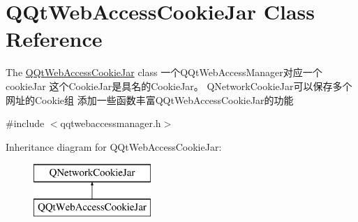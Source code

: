 \hypertarget{class_q_qt_web_access_cookie_jar}{}\section{Q\+Qt\+Web\+Access\+Cookie\+Jar Class Reference}
\label{class_q_qt_web_access_cookie_jar}


The \mbox{\hyperlink{class_q_qt_web_access_cookie_jar}{Q\+Qt\+Web\+Access\+Cookie\+Jar}} class 一个\+Q\+Qt\+Web\+Access\+Manager对应一个cookie\+Jar 这个\+Cookie\+Jar是具名的\+Cookie\+Jar。 Q\+Network\+Cookie\+Jar可以保存多个网址的\+Cookie组 添加一些函数丰富\+Q\+Qt\+Web\+Access\+Cookie\+Jar的功能  




{\ttfamily \#include $<$qqtwebaccessmanager.\+h$>$}

Inheritance diagram for Q\+Qt\+Web\+Access\+Cookie\+Jar\+:\begin{figure}[H]
\begin{center}
\leavevmode
\includegraphics[height=2.000000cm]{class_q_qt_web_access_cookie_jar}
\end{center}
\end{figure}
